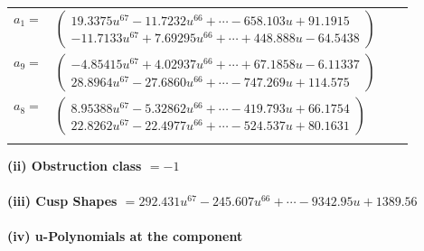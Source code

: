 \documentclass[1p]{elsarticle_modified}
\theoremstyle{definition}
\begin{document}
\begin{tabular}{m{7pt} m{180pt} m{7pt} m{180pt} }
\flushright $a_{1}=$&$\begin{pmatrix}19.3375 u^{67}-11.7232 u^{66}+\cdots-658.103 u+91.1915\\-11.7133 u^{67}+7.69295 u^{66}+\cdots+448.888 u-64.5438\end{pmatrix}$ \\
\flushright $a_{9}=$&$\begin{pmatrix}-4.85415 u^{67}+4.02937 u^{66}+\cdots+67.1858 u-6.11337\\28.8964 u^{67}-27.6860 u^{66}+\cdots-747.269 u+114.575\end{pmatrix}$ \\
\flushright $a_{8}=$&$\begin{pmatrix}8.95388 u^{67}-5.32862 u^{66}+\cdots-419.793 u+66.1754\\22.8262 u^{67}-22.4977 u^{66}+\cdots-524.537 u+80.1631\end{pmatrix}$\\&\end{tabular}
\flushleft \textbf{(ii) Obstruction class $= -1$}\\~\\
\flushleft \textbf{(iii) Cusp Shapes $= 292.431 u^{67}-245.607 u^{66}+\cdots-9342.95 u+1389.56$}\\~\\
\newpage\renewcommand{\arraystretch}{1}
\flushleft \textbf{(iv) u-Polynomials at the component}\newline \\
\end{document}
